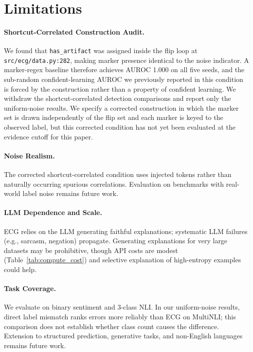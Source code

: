 \documentclass[letterpaper]{article}
\begin{document}
\section*{Limitations}

\paragraph{Shortcut-Correlated Construction Audit.}
We found that \texttt{has\_artifact} was assigned inside the flip loop at \texttt{src/ecg/data.py:282}, making marker presence identical to the noise indicator.
A marker-regex baseline therefore achieves AUROC 1.000 on all five seeds, and the sub-random confident-learning AUROC we previously reported in this condition is forced by the construction rather than a property of confident learning.
We withdraw the shortcut-correlated detection comparisons and report only the uniform-noise results.
We specify a corrected construction in which the marker set is drawn independently of the flip set and each marker is keyed to the observed label, but this corrected condition has not yet been evaluated at the evidence cutoff for this paper.

\paragraph{Noise Realism.}
The corrected shortcut-correlated condition uses injected tokens rather than naturally occurring spurious correlations.
Evaluation on benchmarks with real-world label noise \citep{raczkowska2024allenoise} remains future work.

\paragraph{LLM Dependence and Scale.}
ECG relies on the LLM generating faithful explanations; systematic LLM failures (e.g., sarcasm, negation) propagate.
Generating explanations for very large datasets may be prohibitive, though API costs are modest (Table~\ref{tab:compute_cost}) and selective explanation of high-entropy examples could help.

\paragraph{Task Coverage.}
We evaluate on binary sentiment and 3-class NLI.
In our uniform-noise results, direct label mismatch ranks errors more reliably than ECG on MultiNLI; this comparison does not establish whether class count causes the difference.
Extension to structured prediction, generative tasks, and non-English languages remains future work.
\end{document}
